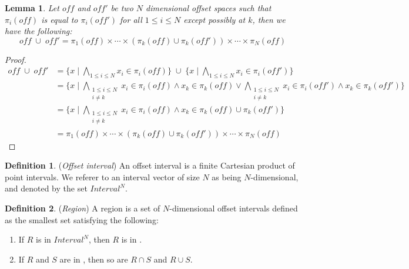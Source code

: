 \documentclass[acmlarge,review]{acmart}
\theoremstyle{definition}
\newtheorem{defn}{Definition}
\theoremstyle{plain}
\newtheorem{lem}{Lemma}
\theoremstyle{remark}
\begin{document}
\begin{lem}{}\label{lem:vector-union}
  Let $\mathit{off}$ and $\mathit{off'}$ be two $N$ dimensional offset
  spaces such that $\pi_i(\mathit{off})$ is equal to $\pi_i(\mathit{off'})$ for all $1
  \leq i \leq N$ except possibly at $k$, then we have the following:
%
  \begin{equation*}
    \mathit{off} \; \cup \; \mathit{off'}
    =
    \pi_1(\mathit{off}) \times \cdots \times
    (\pi_k(\mathit{off}) \cup \pi_k(\mathit{off'})) \times \cdots \times
    \pi_N(\mathit{off})
  \end{equation*}
\end{lem}
%
\begin{proof}
  \begin{align*}
    \mathit{off} \; \cup \; \mathit{off'} &
    = \{x \mid
      \bigwedge_{1 \leq i \leq N } x_i \in \pi_i(\mathit{off}) \}
      \;\cup\;
      \{x \mid
          \bigwedge_{1 \leq i \leq N } x_i \in \pi_i(\mathit{off'}) \} \\
    & = \{x \mid
          \bigwedge_{\substack{1 \leq i \leq N \\ i \neq k}}
            x_i \in \pi_i(\mathit{off}) \wedge x_k \in \pi_k(\mathit{off}) \vee
          \bigwedge_{\substack{1 \leq i \leq N \\ i \neq k}} x_i \in
            \pi_i(\mathit{off'}) \wedge x_k \in \pi_k(\mathit{off'})
        \} \\
    & = \{x \mid
          \bigwedge_{\substack{1 \leq i \leq N \\ i \neq k}} x_i \in
            \pi_i(\mathit{off}) \wedge
            x_k \in \pi_k(\mathit{off}) \cup \pi_k(\mathit{off'})
        \} \\
        & = \pi_1(\mathit{off}) \times \cdots \times
        (\pi_k(\mathit{off}) \cup \pi_k(\mathit{off'})) \times \cdots \times
        \pi_N(\mathit{off})
  \end{align*}
\end{proof}

\begin{defn}{(\emph{Offset interval})}
An offset interval is a finite Cartesian product of point intervals.
We referer to an interval vector of size $N$ as being $N$-dimensional, and
denoted by the set $\textit{Interval}^N$.
\end{defn}

\begin{defn}{(\emph{Region})} 
  A region  is a set of $N$-dimensional offset intervals defined as
  the smallest set satisfying the following:
%
  \begin{enumerate}
    \item If $R$ is in $\textit{Interval}^N$, then $R$ is in .
    \item If $R$ and $S$ are in , then so are $R \cap S$ and
      $R \cup S$.
  \end{enumerate}
\end{defn}
\end{document}
